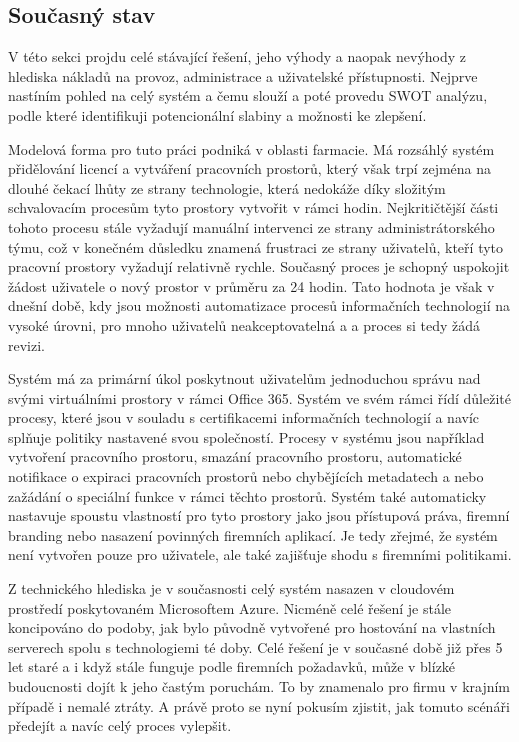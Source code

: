 \documentclass[12pt]{article}
\begin{document}
\begin{sloppypar}
\begin{spacing}{1.15}
        \section*{Současný stav}
        V této sekci projdu celé stávající řešení, jeho výhody a naopak nevýhody
        z hlediska nákladů na provoz, administrace a uživatelské přístupnosti.
        Nejprve nastíním pohled na celý systém a čemu slouží a poté provedu SWOT
        analýzu, podle které identifikuji potencionální slabiny a možnosti ke
        zlepšení.

        Modelová forma pro tuto práci podniká v oblasti farmacie. Má rozsáhlý
        systém přidělování licencí a vytváření pracovních prostorů, který však
        trpí zejména na dlouhé čekací lhůty ze strany technologie, která
        nedokáže díky složitým schvalovacím procesům tyto prostory vytvořit v
        rámci hodin. Nejkritičtější části tohoto procesu stále vyžadují manuální
        intervenci ze strany administrátorského týmu, což v konečném důsledku
        znamená frustraci ze strany uživatelů, kteří tyto pracovní prostory
        vyžadují relativně rychle. Současný proces je schopný uspokojit žádost
        uživatele o nový prostor v průměru za 24 hodin. Tato hodnota je však v
        dnešní době, kdy jsou možnosti automatizace procesů  informačních 
        technologií na vysoké úrovni, pro mnoho uživatelů neakceptovatelná a
        a proces si tedy žádá revizi. 
        
        Systém má za primární úkol poskytnout uživatelům jednoduchou správu nad
        svými virtuálními prostory v rámci Office 365. Systém ve svém rámci řídí 
        důležité procesy, které jsou v souladu s certifikacemi informačních 
        technologií a navíc splňuje politiky nastavené svou společností. Procesy 
        v systému jsou například vytvoření pracovního prostoru, smazání pracovního 
        prostoru, automatické notifikace o expiraci pracovních prostorů nebo chybějících 
        metadatech a nebo zažádání o speciální funkce v rámci těchto prostorů. Systém také
        automaticky nastavuje spoustu vlastností pro tyto prostory jako jsou
        přístupová práva, firemní branding nebo nasazení povinných firemních
        aplikací. Je tedy zřejmé, že systém není vytvořen pouze pro uživatele,
        ale také zajišťuje shodu s firemními politikami.

        Z technického hlediska je v současnosti celý systém nasazen v cloudovém 
        prostředí poskytovaném Microsoftem Azure. Nicméně celé řešení je stále 
        koncipováno do podoby, jak bylo původně vytvořené pro hostování na 
        vlastních serverech spolu s technologiemi té doby. Celé řešení je v 
        současné době již přes 5 let staré a i když stále funguje podle firemních 
        požadavků, může v blízké budoucnosti dojít k jeho častým poruchám. To by
        znamenalo pro firmu v krajním případě i nemalé ztráty. A právě proto se 
        nyní pokusím zjistit, jak tomuto scénáři předejít a navíc celý proces
        vylepšit.


\end{spacing}
\end{sloppypar}
\end{document}
